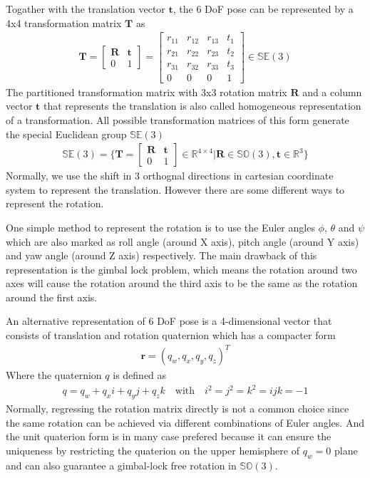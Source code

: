 \documentclass[12pt,DIV14,BCOR12mm,a4paper,footinclude=false,headinclude,parskip=half-,twoside,openright,cleardoublepage=empty,toc=index,bibliography=totoc,listof=totoc]{scrreprt}
\numberwithin{equation}{chapter}
\begin{document}
Togather with the translation vector $\mathbf{t}$, the 6 DoF pose can be represented by a 4x4 transformation matrix $\mathbf{T}$ as
\begin{align}
  \mathbf{T} = \begin{bmatrix}
    \mathbf{R} & \mathbf{t} \\
    0 & 1
  \end{bmatrix}
  = \begin{bmatrix}
    r_{11} & r_{12} & r_{13} & t_{1} \\
    r_{21} & r_{22} & r_{23} & t_{2} \\
    r_{31} & r_{32} & r_{33} & t_{3} \\
    0 & 0 & 0 & 1
  \end{bmatrix}
  \in \mathbb{S} \mathbb{E} (3)
\end{align}
The partitioned transformation matrix with 3x3 rotation matrix $\mathbf{R}$ and a column vector $\mathbf{t}$ that represents the translation is also called homogeneous representation of a transformation. All possible transformation matrices of this form generate the special Euclidean group $\mathbb{S} \mathbb{E} (3)$
\begin{align}
  \mathbb{S} \mathbb{E} (3) = \{\mathbf{T} = \begin{bmatrix}
    \mathbf{R} & \mathbf{t} \\
    0 & 1
  \end{bmatrix}\in \mathbb{R}^{4 \times 4}| \mathbf{R} \in \mathbb{S} \mathbb{O} (3), \mathbf{t} \in \mathbb{R}^{3} \}
\end{align}
Normally, we use the shift in 3 orthognal directions in cartesian coordinate system to represent the translation. However there are some different ways to represent the rotation.

One simple method to represent the rotation is to use the Euler angles $\phi$, $\theta$ and $\psi$ which are also marked as roll angle (around X axis), pitch angle (around Y axis) and yaw angle (around Z axis) respectively. The main drawback of this representation is the gimbal lock problem, which means the rotation around two axes will cause the rotation around the third axis to be the same as the rotation around the first axis.

An alternative representation of 6 DoF pose is a 4-dimensional vector that consists of translation and rotation quaternion which has a compacter form
\begin{align}
  \mathbf{r} = (q_{w}, q_{x}, q_{y}, q_{z})^{T}
\end{align}
Where the quaternion $q$ is defined as
\begin{align}
  q = q_{w} + q_{x}i + q_{y}j + q_{z}k \quad \textrm{with} \quad i^{2} = j^{2} = k^{2} = ijk = -1
\end{align}
Normally, regressing the rotation matrix directly is not a common choice since the same rotation can be achieved via different combinations of Euler angles. And the unit quaterion form is in many case prefered because it can ensure the uniqueness by restricting the quaterion on the upper hemisphere of $q_{w}=0$ plane and can also guarantee a gimbal-lock free rotation in $\mathbb{S} \mathbb{O} (3)$\cite{9231126}. 
\end{document}
